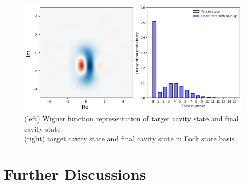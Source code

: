 \documentclass[12pt]{report}
\begin{document}
\begin{figure}[H]
    \centering
    \includegraphics[width=0.95\linewidth]{vac2cat_simulation.png}
    \caption{
       (left) Wigner function representation of target cavity state and final cavity state 
       \\
       (right) target cavity state and final cavity state in Fock state basis
    }
    \label{fig:vac2cat_simulation}
\end{figure}

\section{Further Discussions}\label{sec:further_discussions}
\end{document}
